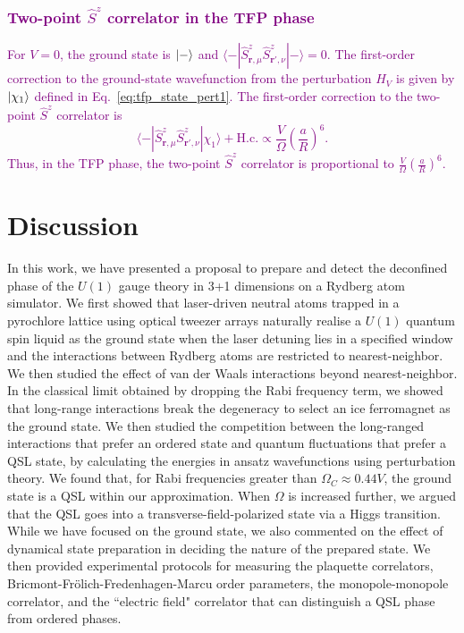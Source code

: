 \documentclass[twocolumn,superscriptaddress,amsmath,amssymb,aps,prx,nofootinbib]{revtex4-2}
\newcommand{\newtext}[1]{\textcolor{purple}{#1}}
\begin{document}
\newtext{\subsubsection{Two-point $\hat{S}^z$ correlator in the TFP phase}}
\label{sec:sz_sz_corr_tfp}
\newtext{For $V = 0$, the ground state is $\ket{-}$ and $\langle - | \hat{S}^z_{\mathbf{r},\mu}\hat{S}^z_{\mathbf{r'},\nu} | - \rangle = 0 $. The first-order correction to the ground-state wavefunction from the perturbation $\hat{H}_V$ is given by $\ket{\chi_1}$ defined in Eq.~\eqref{eq:tfp_state_pert1}. The first-order correction to the two-point $\hat{S}^z$ correlator is 
\begin{equation}
\langle - | \hat{S}^z_{\mathbf{r},\mu}\hat{S}^z_{\mathbf{r'},\nu} | \chi_1 \rangle + \text{H.c.} \propto \frac{V}{\Omega} \left( \frac{a}{R} \right)^6.
\end{equation}
Thus, in the TFP phase, the two-point $\hat{S}^z$ correlator is proportional to $\frac{V}{\Omega} \left( \frac{a}{R} \right)^6$.}\\

\section{Discussion}\label{sec:discussion}
In this work, we have presented a proposal to prepare and detect the deconfined phase of the $U(1)$ gauge theory in 3+1 dimensions on a Rydberg atom simulator. We first showed that laser-driven  neutral atoms trapped in a pyrochlore lattice using optical tweezer arrays naturally realise a $U(1)$ quantum spin liquid as the ground state when the laser detuning lies in a specified window and the interactions between Rydberg atoms are restricted to nearest-neighbor. We then studied the effect of van der Waals interactions beyond nearest-neighbor. In the classical limit obtained by dropping the Rabi frequency term, we showed that long-range interactions break the degeneracy to select an ice ferromagnet as the ground state. We then studied the competition between the long-ranged interactions that prefer an ordered state and quantum fluctuations that prefer a QSL state, by calculating the energies in ansatz wavefunctions using perturbation theory. We found that, for Rabi frequencies greater than $\Omega_C \approx 0.44 V$, the ground state is a QSL within our approximation. When $\Omega$ is increased further, we argued that the QSL goes into a transverse-field-polarized state via a Higgs transition. While we have focused on the ground state, we also commented on the effect of dynamical state preparation in deciding the nature of the prepared state. We then provided experimental protocols for measuring the plaquette correlators, Bricmont-Fr{\"o}lich-Fredenhagen-Marcu order parameters, the monopole-monopole correlator, and the ``electric field" correlator that can distinguish a QSL phase from ordered phases.
\end{document}
